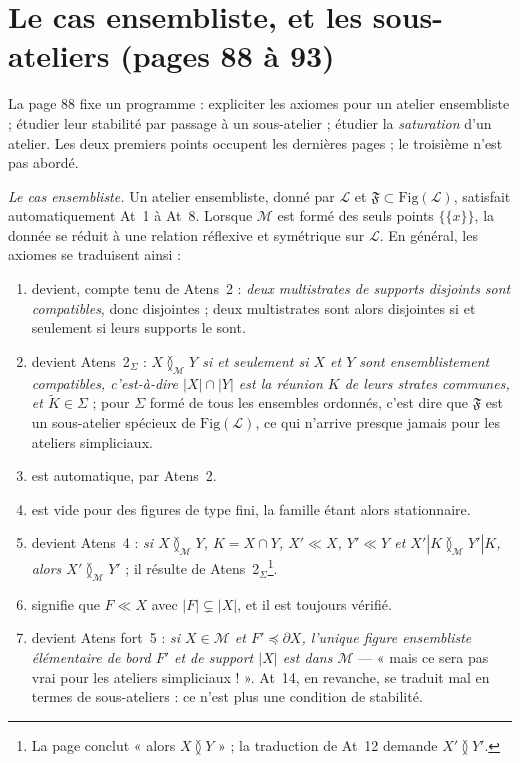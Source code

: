 \documentclass[11pt,a4paper]{article}
\begin{document}
\section*{Le cas ensembliste, et les sous-ateliers (pages 88 à 93)}

La page 88 fixe un programme : expliciter les axiomes pour un atelier
ensembliste ; étudier leur stabilité par passage à un sous-atelier ; étudier la
\emph{saturation} d'un atelier. Les deux premiers points occupent les dernières
pages ; le troisième n'est pas abordé.

\emph{Le cas ensembliste.} Un atelier ensembliste, donné par $\mathcal{L}$ et
$\mathfrak{F} \subset \mathrm{Fig}(\mathcal{L})$, satisfait automatiquement At~1 à
At~8. Lorsque $\mathcal{M}$ est formé des seuls points $\lbrace \lbrace x \rbrace
\rbrace$, la donnée se réduit à une relation réflexive et symétrique sur
$\mathcal{L}$. En général, les axiomes se traduisent ainsi :
\begin{enumerate}
\item[At~9] devient, compte tenu de Atens~2 : \emph{deux multistrates de supports
disjoints sont compatibles}, donc disjointes ; deux multistrates sont alors
disjointes si et seulement si leurs supports le sont.
\item[At~9$_{\Sigma}$] devient Atens~2$_{\Sigma}$ : \emph{$X
\between_{\mathcal{M}} Y$ si et seulement si $X$ et $Y$ sont ensemblistement
compatibles, c'est-à-dire $|X| \cap |Y|$ est la réunion $K$ de leurs strates
communes, et $\widetilde{K} \in \Sigma$} ; pour $\Sigma$ formé de tous les
ensembles ordonnés, c'est dire que $\mathfrak{F}$ est un sous-atelier spécieux de
$\mathrm{Fig}(\mathcal{L})$, ce qui n'arrive presque jamais pour les ateliers
simpliciaux.
\item[At~10] est automatique, par Atens~2.
\item[At~11 bis] est vide pour des figures de type fini, la famille étant alors
stationnaire.
\item[At~12] devient Atens~4 : \emph{si $X \between_{\mathcal{M}} Y$, $K = X \cap
Y$, $X' \ll X$, $Y' \ll Y$ et $X'|K \between_{\mathcal{M}} Y'|K$, alors $X'
\between_{\mathcal{M}} Y'$} ; il résulte de Atens~2$_{\Sigma}$\footnote{La page
conclut « alors $X \between Y$ » ; la traduction de At~12 demande $X' \between
Y'$.}.
\item[At~13] signifie que $F \ll X$ avec $|F| \subsetneq |X|$, et il est toujours
vérifié.
\item[At~14 bis] devient Atens fort~5 : \emph{si $X \in \mathcal{M}$ et $F'
\preccurlyeq \partial X$, l'unique figure ensembliste élémentaire de bord $F'$ et
de support $|X|$ est dans $\mathcal{M}$} --- « mais ce sera pas vrai pour les
ateliers simpliciaux ! ». At~14, en revanche, se traduit mal en termes de
sous-ateliers : ce n'est plus une condition de stabilité.
\end{enumerate}
\end{document}
